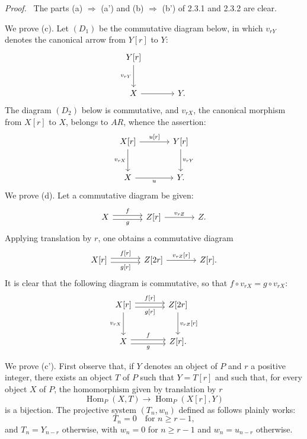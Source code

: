 \documentclass[11pt]{article}
\newenvironment{prooftext}[1][Proof]{\par\noindent\emph{#1.}\ }{\par\medskip}
\DeclareMathOperator{\Hom}{Hom}
\providecommand{\Hom}{\operatorname{Hom}}
\providecommand{\Hom}{\operatorname{Hom}}
\begin{document}
\begin{prooftext}[Proof]
The parts (a) $\Rightarrow$ (a') and (b) $\Rightarrow$ (b') of 2.3.1 and 2.3.2 are clear.

We prove (c). Let $(D_1)$ be the commutative diagram below, in which $v_{rY}$ denotes the canonical arrow from $Y[r]$ to $Y$:
\[
\begin{tikzcd}[column sep=large,row sep=large]
Y[r] \arrow[d,"{v_{rY}}"']\\
X \arrow[r] & Y .
\end{tikzcd}
\]
The diagram $(D_2)$ below is commutative, and $v_{rX}$, the canonical morphism from $X[r]$ to $X$, belongs to $AR$, whence the assertion:
\[
\begin{tikzcd}[column sep=large,row sep=large]
X[r] \arrow[r,"{u[r]}"] \arrow[d,"{v_{rX}}"'] & Y[r] \arrow[d,"{v_{rY}}"]\\
X \arrow[r,"u"'] & Y .
\end{tikzcd}
\]
We prove (d). Let a commutative diagram be given:
\[
\begin{tikzcd}[column sep=large]
X \arrow[r,shift left,"f"] \arrow[r,shift right,"g"'] & Z[r] \arrow[r,"{v_{rZ}}"] & Z .
\end{tikzcd}
\]
Applying translation by $r$, one obtains a commutative diagram
\[
\begin{tikzcd}[column sep=large]
X[r] \arrow[r,shift left,"{f[r]}"] \arrow[r,shift right,"{g[r]}"'] & Z[2r] \arrow[r,"{v_{rZ}[r]}"] & Z[r].
\end{tikzcd}
\]
It is clear that the following diagram is commutative, so that $f\circ v_{rX}=g\circ v_{rX}$:
\[
\begin{tikzcd}[column sep=large,row sep=large]
X[r] \arrow[r,shift left,"{f[r]}"] \arrow[r,shift right,"{g[r]}"'] \arrow[d,"{v_{rX}}"'] & Z[2r] \arrow[d,"{v_{rZ}[r]}"]\\
X \arrow[r,shift left,"f"] \arrow[r,shift right,"g"'] & Z[r] .
\end{tikzcd}
\]

We prove (c'). First observe that, if $Y$ denotes an object of $P$ and $r$ a positive integer, there exists an object $T$ of $P$ such that $Y=T[r]$ and such that, for every object $X$ of $P$, the homomorphism given by translation by $r$
\[
\Hom_P(X,T)\longrightarrow\Hom_P(X[r],Y)
\]
is a bijection. The projective system $(T_n,w_n)$ defined as follows plainly works:
\[
T_n=0\quad\text{for } n\ge r-1,
\]
and $T_n=Y_{n-r}$ otherwise, with $w_n=0$ for $n\ge r-1$ and $w_n=u_{n-r}$ otherwise.


\end{prooftext}
\end{document}
